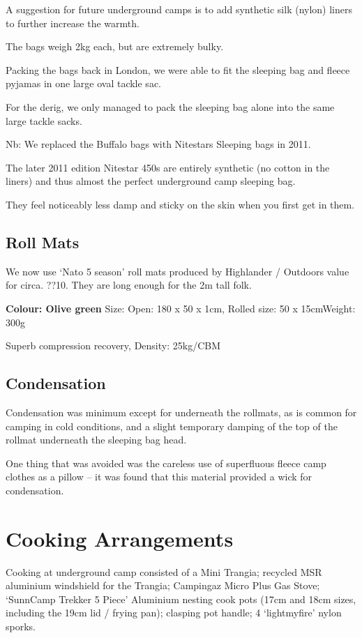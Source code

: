 A suggestion for future underground camps is to add synthetic silk
(nylon) liners to further increase the warmth.

The bags weigh 2kg each, but are extremely bulky.

Packing the bags back in London, we were able to fit the sleeping bag
and fleece pyjamas in one large oval tackle sac.

For the derig, we only managed to pack the sleeping bag alone into the
same large tackle sacks.

Nb: We replaced the Buffalo bags with Nitestars Sleeping bags in 2011.

The later 2011 edition Nitestar 450s are entirely synthetic (no cotton
in the liners) and thus almost the perfect underground camp sleeping
bag.

They feel noticeably less damp and sticky on the skin when you first get
in them.


\subsection{Roll Mats}

We now use `Nato 5 season' roll mats produced by Highlander / Outdoors
value for circa. ??10. They are long enough for the 2m tall folk.

\textbf{Colour: Olive green} Size: Open: 180 x 50 x 1cm, Rolled size: 50
x 15cmWeight: 300g

Superb compression recovery, Density: 25kg/CBM


\subsection{Condensation}

Condensation was minimum except for underneath the rollmats, as is
common for camping in cold conditions, and a slight temporary damping of
the top of the rollmat underneath the sleeping bag head.

One thing that was avoided was the careless use of superfluous fleece
camp clothes as a pillow -- it was found that this material provided a
wick for condensation.


\section{Cooking Arrangements}

Cooking at underground camp consisted of a Mini Trangia; recycled MSR
aluminium windshield for the Trangia; Campingaz Micro Plus Gas Stove;
`SunnCamp Trekker 5 Piece' Aluminium nesting cook pots (17cm and 18cm
sizes, including the 19cm lid / frying pan); clasping pot handle; 4
`lightmyfire' nylon sporks.

